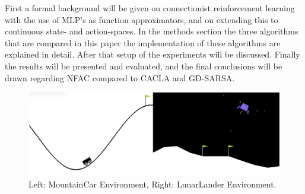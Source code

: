 




First a formal background will be given on connectionist reinforcement learning with the use of MLP's as function approximators,
and on extending this to continuous state- and action-spaces. In the methods section the three algorithms that are compared
 in this paper the implementation of these algorithms are explained in detail. After that setup of the experiments will be discussed.
Finally the results will be presented and evaluated, and the final conclusions will be drawn regarding NFAC compared to CACLA and GD-SARSA.

\begin{figure}[t]
 \centering 
    \includegraphics[width = 0.7\columnwidth]{figs/mountainlunar.png}
 \caption{Left: MountainCar Environment, Right: LunarLander Environment.}
\label{fig:mountainlunar}
\end{figure}
